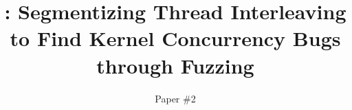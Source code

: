 \title{\sys: Segmentizing Thread Interleaving to Find Kernel Concurrency Bugs through Fuzzing}

\ifdefined\DRAFT
 \pagestyle{fancyplain}
 \rhead{\thedate}
\fi



\author{
  Paper \#2
}


